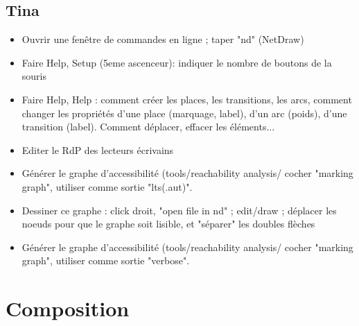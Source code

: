 \documentclass[compress]{beamer}
\begin{document}
\subsection{Tina}
\begin{frame}
\begin{small}
\begin{itemize}
\item Ouvrir une fenêtre de commandes en ligne ; taper "nd" (NetDraw)
\item Faire Help, Setup (5eme ascenceur): indiquer le nombre de boutons de la souris
\item Faire Help, Help : comment créer les  places, les transitions, les arcs, comment changer les propriétés d'une place (marquage, label), d'un arc (poids), d'une transition (label). Comment déplacer, effacer les éléments...
\item Editer le RdP des lecteurs écrivains
\item Générer le graphe d'accessibilité (tools/reachability analysis/ cocher "marking graph", utiliser comme sortie "lts(.aut)".
\item Dessiner ce graphe : click droit, "open file in nd" ; edit/draw ; déplacer les noeuds pour que le graphe soit lisible, et "séparer" les doubles flèches
\item Générer le graphe d'accessibilité (tools/reachability analysis/ cocher "marking graph", utiliser comme sortie "verbose".
\end{itemize}
\end{small}
\end{frame}    

\section{Composition}
\begin{frame}
\tableofcontents[hideothersubsections]
\end{frame}
\end{document}
